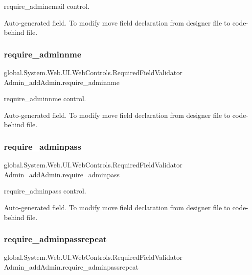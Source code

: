 require\+\_\+adminemail control. 

Auto-\/generated field. To modify move field declaration from designer file to code-\/behind file. \mbox{\label{class_admin__add_admin_a7616453cc8ae879ca0af5d8223900e3f}} 
\subsubsection{\texorpdfstring{require\_adminnme}{require\_adminnme}}
{\footnotesize\ttfamily global.\+System.\+Web.\+U\+I.\+Web\+Controls.\+Required\+Field\+Validator Admin\+\_\+add\+Admin.\+require\+\_\+adminnme\hspace{0.3cm}{\ttfamily [protected]}}



require\+\_\+adminnme control. 

Auto-\/generated field. To modify move field declaration from designer file to code-\/behind file. \mbox{\label{class_admin__add_admin_a42e8c229b422bff672c6f07451d7508b}} 
\subsubsection{\texorpdfstring{require\_adminpass}{require\_adminpass}}
{\footnotesize\ttfamily global.\+System.\+Web.\+U\+I.\+Web\+Controls.\+Required\+Field\+Validator Admin\+\_\+add\+Admin.\+require\+\_\+adminpass\hspace{0.3cm}{\ttfamily [protected]}}



require\+\_\+adminpass control. 

Auto-\/generated field. To modify move field declaration from designer file to code-\/behind file. \mbox{\label{class_admin__add_admin_acf38038b136b99be08e9294e94dc2bf7}} 
\subsubsection{\texorpdfstring{require\_adminpassrepeat}{require\_adminpassrepeat}}
{\footnotesize\ttfamily global.\+System.\+Web.\+U\+I.\+Web\+Controls.\+Required\+Field\+Validator Admin\+\_\+add\+Admin.\+require\+\_\+adminpassrepeat\hspace{0.3cm}{\ttfamily [protected]}}



